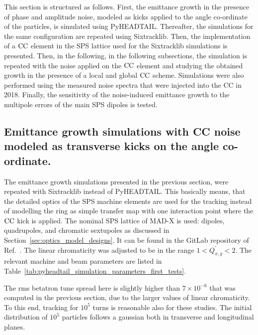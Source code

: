 This section is structured as follows. First, the emittance growth in the presence of phase and amplitude noise, modeled as kicks applied to the angle co-ordinate of the particles, is simulated using PyHEADTAIL. Thereafter, the simulations for the same configuration are repeated using Sixtracklib. Then, the implementation of a ${\mathrm{CC}}$ element in the SPS lattice used for the Sixtracklib simulations is presented. Then, in the following, in the following subsections, the simulation is repeated with the noise applied on the ${\mathrm{CC}}$ element and studying the obtained growth in the presence of a local and global ${\mathrm{CC}}$ scheme. Simulations were also performed using the measured noise spectra that were injected into the CC in 2018. Finally, the sensitivity of the noise-induced emittance growth to the multipole errors of the main SPS dipoles is tested.

\subsection{Emittance growth simulations with CC noise modeled as transverse kicks on the angle co-ordinate.}\label{subsec:sixtracklib_kicks_transverse_angle}

The emittance growth simulations presented in the previous section, were repeated with Sixtracklib instead of PyHEADTAIL. This basically means, that the detailed optics of the SPS machine elements are used for the tracking instead of modelling the ring as simple transfer map with one interaction point where the ${\mathrm{CC}}$  kick is applied. The nominal SPS lattice of MAD-X is used: dipoles, quadrupoles, and chromatic sextupoles as discussed in Section~\ref{sec:optics_model_designs}. It can be found in the GitLab repository of Ref.~\cite{cern_optics_repo}. The linear chromaticity was adjusted to be in the range $1 < Q^\prime_{x,y} < 2$. The relevant machine and beam parameters are listed in Table~\ref{tab:pyheadtail_simulation_parameters_first_tests}.

The rms betatron tune spread here is slightly higher than $7 \times 10^{-6}$ that was computed in the previous section, due to the larger values of linear chromaticity. To this end, tracking for $10^{5}$ turns is reasonable also for these studies. The initial distribution of $10^5$ particles follows a gaussian both in transverse and longitudinal planes.

